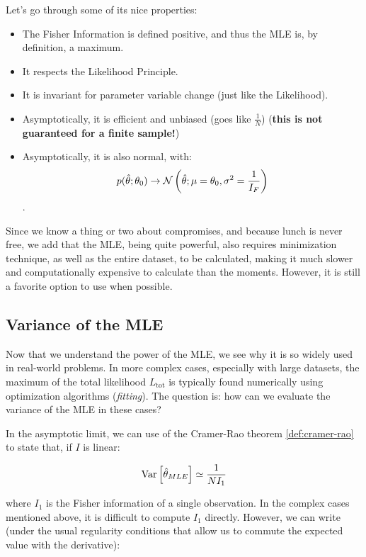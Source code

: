 Let's go through some of its nice properties:
\begin{itemize}
	\item The Fisher Information is defined positive, and thus the MLE is, by definition, a maximum.
	\item It respects the Likelihood Principle.
	\item It is invariant for parameter variable change (just like the Likelihood).
	\item Asymptotically, it is efficient and unbiased (goes like $\frac{1}{N}$) (\textbf{this is not guaranteed for a finite sample!})
	\item Asymptotically, it is also normal, with: \[p(\hat\theta;\theta_0) \rightarrow \mathcal{N}\left(\hat{\theta}; \mu=\theta_0,\sigma^2=\frac{1}{I_F}\right)\].
\end{itemize}

Since we know a thing or two about compromises, and because lunch is never free, we add that the MLE, being quite powerful, also requires minimization technique, as well as the entire dataset, to be calculated, making it much slower and computationally expensive to calculate than the moments. However, it is still a favorite option to use when possible. 


\subsection{Variance of the MLE}

Now that we understand the power of the MLE, we see why it is so widely used in real-world problems. In more complex cases, especially with large datasets, the maximum of the total likelihood $L_{\text{tot}}$ is typically found numerically using optimization algorithms (\emph{fitting}). The question is: how can we evaluate the variance of the MLE in these cases?

In the asymptotic limit, we can use of the Cramer-Rao theorem \ref{def:cramer-rao} to state that, if $I$ is linear:

	\[
		\operatorname{Var}\left[\hat\theta_{MLE}\right]\simeq\frac{1}{NI_1}
	\]
	
where $I_1$ is the Fisher information of a single observation. 
In the complex cases mentioned above, it is difficult to compute $I_1$ directly. However, we can write (under the usual regularity conditions that allow us to commute the expected value with the derivative):

